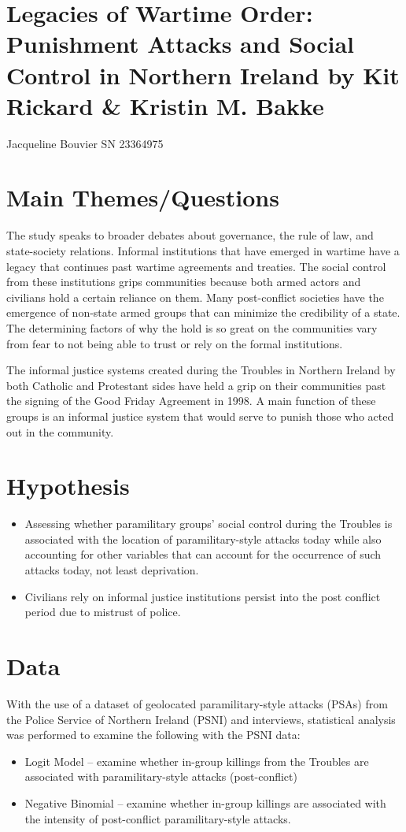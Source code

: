 \documentclass[12pt,letterpaper]{article}
\begin{document}
\maketitle
	\section*{Legacies of Wartime Order: Punishment Attacks and Social Control in Northern Ireland by Kit Rickard & Kristin M. Bakke }
	
	Jacqueline Bouvier SN 23364975
\section*{Main Themes/Questions}
The study speaks to broader debates about governance, the rule of law, and state-society relations. Informal institutions that have emerged in wartime have a legacy that continues past wartime agreements and treaties. The social control from these institutions grips communities because both armed actors and civilians hold a certain reliance on them. Many post-conflict societies have the emergence of non-state armed groups that can minimize the credibility of a state. The determining factors of why the hold is so great on the communities vary from fear to not being able to trust or rely on the formal institutions.

The informal justice systems created during the Troubles in Northern Ireland by both Catholic and Protestant sides have held a grip on their communities past the signing of the Good Friday Agreement in 1998. A main function of these groups is an informal justice system that would serve to punish those who acted out in the community.
\section*{Hypothesis}
\begin{itemize}
\item Assessing whether paramilitary groups’ social control during the Troubles is associated with the location of paramilitary-style attacks today while also accounting for other variables that can account for the occurrence of such attacks today, not least deprivation.
\item Civilians rely on informal justice institutions persist into the post conflict period due to mistrust of police.
\end{itemize}
\section*{Data}
With the use of a dataset of geolocated paramilitary-style attacks (PSAs) from the Police Service of Northern Ireland (PSNI) and interviews, statistical analysis was performed to examine the following with the PSNI data:
\begin{itemize}
	\item Logit Model – examine whether in-group killings from the Troubles are associated with paramilitary-style attacks (post-conflict)
	\item Negative Binomial – examine whether in-group killings are associated with the intensity of post-conflict paramilitary-style attacks.
\end{itemize}
\end{document}
